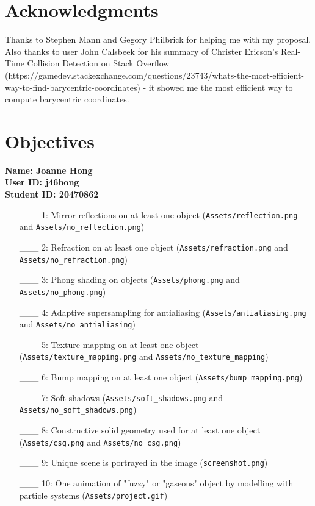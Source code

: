 \documentclass{article}
\begin{document}
\section{Acknowledgments}
Thanks to Stephen Mann and Gegory Philbrick for helping me with my proposal. Also thanks to user John Calsbeek for his summary of Christer Ericson's Real-Time Collision Detection on Stack Overflow (https://gamedev.stackexchange.com/questions/23743/whats-the-most-efficient-way-to-find-barycentric-coordinates) - it showed me the most efficient way to compute barycentric coordinates.

\newpage

\section{Objectives}

\textbf{Name: Joanne Hong} \\

\textbf{User ID: j46hong} \\

\textbf{Student ID: 20470862} \\

\begin{enumerate}
  \item[\_\_\_ 1:]  Mirror reflections on at least one object (\texttt{Assets/reflection.png} and \texttt{Assets/no\_reflection.png})

  \item[\_\_\_ 2:]  Refraction on at least one object (\texttt{Assets/refraction.png} and \texttt{Assets/no\_refraction.png})

  \item[\_\_\_ 3:]  Phong shading on objects (\texttt{Assets/phong.png} and \texttt{Assets/no\_phong.png})

  \item[\_\_\_ 4:]  Adaptive supersampling for antialiasing (\texttt{Assets/antialiasing.png} and \texttt{Assets/no\_antialiasing})

  \item[\_\_\_ 5:]  Texture mapping on at least one object (\texttt{Assets/texture\_mapping.png} and \texttt{Assets/no\_texture\_mapping})

  \item[\_\_\_ 6:]  Bump mapping on at least one object (\texttt{Assets/bump\_mapping.png})

  \item[\_\_\_ 7:]  Soft shadows (\texttt{Assets/soft\_shadows.png} and \texttt{Assets/no\_soft\_shadows.png})

  \item[\_\_\_ 8:]  Constructive solid geometry used for at least one object (\texttt{Assets/csg.png} and \texttt{Assets/no\_csg.png})

  \item[\_\_\_ 9:]  Unique scene is portrayed in the image (\texttt{screenshot.png})

  \item[\_\_\_ 10:]  One animation of "fuzzy" or "gaseous" object by modelling with particle systems (\texttt{Assets/project.gif})
\end{enumerate}
\end{document}
